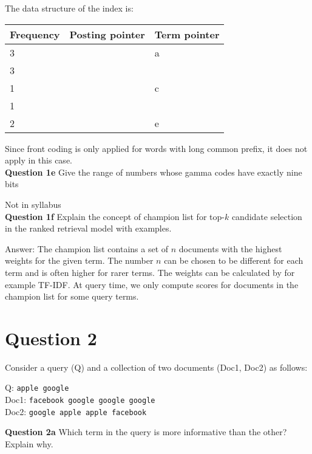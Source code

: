 \documentclass[11pt,a4paper]{report}
\begin{document}
\begin{multicols*}{2}
\noindent The data structure of the index is:

\begin{center}
\begin{tabular}{ | l | l | l |} 
    \hline
    Frequency & Posting pointer & Term pointer \\
    \hline
    3 & & a \\
    3 & & \\
    1 & & c \\
    1 & & \\
    2 & & e \\
    \hline
\end{tabular}
\end{center}

\noindent Since front coding is only applied for words with long common prefix, it does not apply in this case.\\

\noindent \textbf{Question 1e} Give the range of numbers whose gamma codes have exactly nine bits

\noindent Not in syllabus \\

\noindent \textbf{Question 1f} Explain the concept of champion list for top-$k$ candidate selection in the ranked retrieval model with examples. 

\noindent Answer: The champion list contains a set of $n$ documents with the highest weights for the given term. The number $n$ can be chosen to be different for each term and is often higher for rarer terms. The weights can be calculated by for example TF-IDF. At query time, we only compute scores for documents in the champion list for some query terms.

\section{Question 2}

\noindent Consider a query (Q) and a collection of two documents (Doc1, Doc2) as follows:

\begin{center}
Q: \verb|apple google|\\
Doc1: \verb|facebook google google google|\\
Doc2: \verb|google apple apple facebook|\\
\end{center}

\noindent \textbf{Question 2a} Which term in the query is more informative than the other? Explain why.


\end{multicols*}
\end{document}
